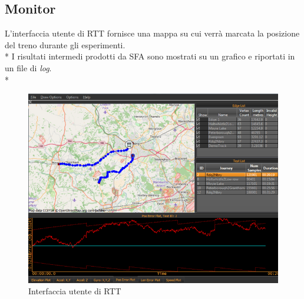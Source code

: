 \subsection{Monitor}
L'interfaccia utente di RTT fornisce una mappa su cui verr\`a marcata la posizione del treno durante gli esperimenti.\\*
I risultati intermedi prodotti da SFA sono mostrati su un grafico e riportati in un file di \emph{log}.\\*
\begin{figure}[h]
	\centering
	\includegraphics[width=0.7\linewidth]{img/rtthci2}
	\caption{Interfaccia utente di RTT}
	\label{fig:rtthci2}
\end{figure}
